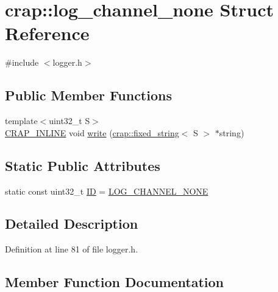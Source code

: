 \hypertarget{structcrap_1_1log__channel__none}{}\section{crap\+:\+:log\+\_\+channel\+\_\+none Struct Reference}
\label{structcrap_1_1log__channel__none}


{\ttfamily \#include $<$logger.\+h$>$}

\subsection*{Public Member Functions}
\begin{DoxyCompactItemize}
\item 
{\footnotesize template$<$uint32\+\_\+t S$>$ }\\\hyperlink{config__x86_8h_a5a40526b8d842e7ff731509998bb0f1c}{C\+R\+A\+P\+\_\+\+I\+N\+L\+I\+N\+E} void \hyperlink{structcrap_1_1log__channel__none_a42266d60908df5f29eeae4c1783b0d35}{write} (\hyperlink{classcrap_1_1fixed__string}{crap\+::fixed\+\_\+string}$<$ S $>$ $\ast$string)
\end{DoxyCompactItemize}
\subsection*{Static Public Attributes}
\begin{DoxyCompactItemize}
\item 
static const uint32\+\_\+t \hyperlink{structcrap_1_1log__channel__none_a89fbd07fda3d141e97186a0e8bee52b8}{I\+D} = \hyperlink{logger_8h_a174a79b60892db79419f17fa90b664ce}{L\+O\+G\+\_\+\+C\+H\+A\+N\+N\+E\+L\+\_\+\+N\+O\+N\+E}
\end{DoxyCompactItemize}


\subsection{Detailed Description}


Definition at line 81 of file logger.\+h.



\subsection{Member Function Documentation}
\hypertarget{structcrap_1_1log__channel__none_a42266d60908df5f29eeae4c1783b0d35}{}
